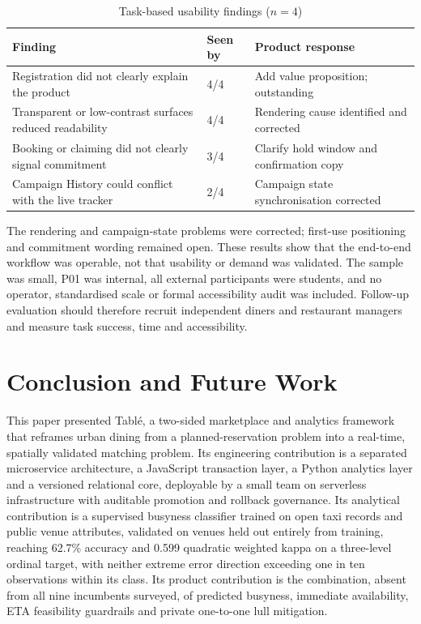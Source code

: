 \documentclass[conference]{IEEEtran}
\begin{document}
\begin{table}[htbp]
\caption{Task-based usability findings ($n=4$)}
\label{tab:usability-findings}
\centering
\footnotesize
\begin{tabular}{@{}p{}p{}p{}@{}}
\toprule
Finding & Seen by & Product response \\
\midrule
Registration did not clearly explain the product & 4/4 & Add value proposition; outstanding \\
Transparent or low-contrast surfaces reduced readability & 4/4 & Rendering cause identified and corrected \\
Booking or claiming did not clearly signal commitment & 3/4 & Clarify hold window and confirmation copy \\
Campaign History could conflict with the live tracker & 2/4 & Campaign state synchronisation corrected \\
\bottomrule
\end{tabular}
\end{table}

The rendering and campaign-state problems were corrected; first-use positioning and commitment wording remained open. These results show that the end-to-end workflow was operable, not that usability or demand was validated. The sample was small, P01 was internal, all external participants were students, and no operator, standardised scale or formal accessibility audit was included. Follow-up evaluation should therefore recruit independent diners and restaurant managers and measure task success, time and accessibility.

\section{Conclusion and Future Work}

This paper presented Tabl\'{e}, a two-sided marketplace and analytics framework that reframes urban dining from a planned-reservation problem into a real-time, spatially validated matching problem. Its engineering contribution is a separated microservice architecture, a JavaScript transaction layer, a Python analytics layer and a versioned relational core, deployable by a small team on serverless infrastructure with auditable promotion and rollback governance. Its analytical contribution is a supervised busyness classifier trained on open taxi records and public venue attributes, validated on venues held out entirely from training, reaching 62.7\% accuracy and 0.599 quadratic weighted kappa on a three-level ordinal target, with neither extreme error direction exceeding one in ten observations within its class. Its product contribution is the combination, absent from all nine incumbents surveyed, of predicted busyness, immediate availability, ETA feasibility guardrails and private one-to-one lull mitigation.
\end{document}
